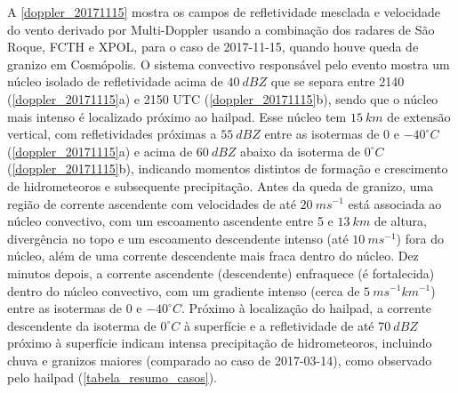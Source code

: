 A \autoref{doppler_20171115} mostra os campos de refletividade mesclada e velocidade do vento derivado por Multi-Doppler usando a combinação dos radares de São Roque, FCTH e XPOL, para o caso de 2017-11-15, quando houve queda de granizo em Cosmópolis. O sistema convectivo responsável pelo evento mostra um núcleo isolado de refletividade acima de $40\:dBZ$ que se separa entre 2140 (\autoref{doppler_20171115}a) e 2150 UTC (\autoref{doppler_20171115}b), sendo que o núcleo mais intenso é localizado próximo ao hailpad. Esse núcleo tem $15\:km$ de extensão vertical, com refletividades próximas a $55\:dBZ$ entre as isotermas de 0 e $-40^{\circ}C$ (\autoref{doppler_20171115}a) e acima de $60\:dBZ$ abaixo da isoterma de $0^{\circ}C$ (\autoref{doppler_20171115}b), indicando momentos distintos de formação e crescimento de hidrometeoros e subsequente precipitação. Antes da queda de granizo, uma região de corrente ascendente com velocidades de até $20\:ms^{-1}$ está associada ao núcleo convectivo, com um escoamento ascendente entre 5 e $13\:km$ de altura, divergência no topo e um escoamento descendente intenso (até $10\:ms^{-1}$) fora do núcleo, além de uma corrente descendente mais fraca dentro do núcleo. Dez minutos depois, a corrente ascendente (descendente) enfraquece (é fortalecida) dentro do núcleo convectivo, com um gradiente intenso (cerca de $5\:ms^{-1}km^{-1}$) entre as isotermas de 0 e $-40^{\circ}C$. Próximo à localização do hailpad, a corrente descendente da isoterma de $0^{\circ}C$ à superfície e a refletividade de até $70\:dBZ$ próximo à superfície indicam intensa precipitação de hidrometeoros, incluindo chuva e granizos maiores (comparado ao caso de 2017-03-14), como observado pelo hailpad (\autoref{tabela_resumo_casos}).

